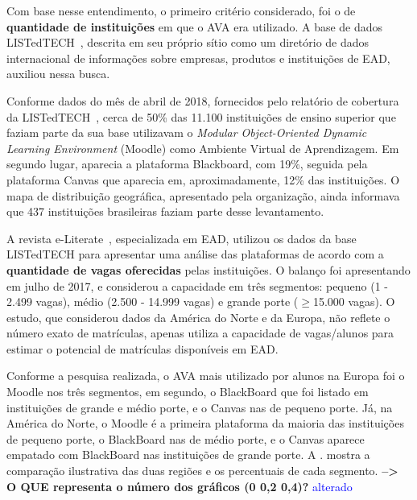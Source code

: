 Com base nesse entendimento, o primeiro critério considerado, foi o de \textbf{quantidade de instituições} em que o AVA era utilizado. A base de dados LISTedTECH~\cite{listedtech}, descrita em seu próprio sítio como um diretório de dados internacional de informações sobre empresas, produtos e instituições de EAD, auxiliou nessa busca. 

Conforme dados do mês de  abril de 2018, fornecidos pelo relatório de cobertura da LISTedTECH~\cite{listedtech}, cerca de 50\% das 11.100 instituições de ensino superior que faziam parte da sua base utilizavam o \textit{Modular Object-Oriented Dynamic Learning Environment} (Moodle) como Ambiente Virtual de Aprendizagem. Em segundo lugar, aparecia a plataforma Blackboard, com 19\%, seguida pela plataforma Canvas que aparecia em, aproximadamente, 12\% das instituições. O mapa de distribuição geográfica, apresentado pela organização, ainda informava que 437 instituições brasileiras faziam parte desse levantamento.

A revista e-Literate~\cite{phil@lms}, especializada em EAD, utilizou os dados da base LISTedTECH para apresentar uma análise das plataformas de acordo com a \textbf{quantidade de vagas oferecidas} pelas instituições. O balanço foi apresentando em julho de 2017, e considerou a capacidade em três segmentos: pequeno (1 - 2.499 vagas), médio (2.500 - 14.999 vagas) e grande porte ($\geq$15.000 vagas). O estudo, que considerou dados da América do Norte e da Europa, não reflete o número exato de matrículas, apenas utiliza a capacidade de vagas/alunos para estimar o potencial de matrículas disponíveis em EAD. %

Conforme a pesquisa realizada, o AVA mais utilizado por alunos na Europa foi o Moodle nos três segmentos, em segundo, o BlackBoard que foi listado em instituições de grande e médio porte, e o Canvas nas de pequeno porte. Já, na América do Norte, o Moodle é a primeira plataforma da maioria das instituições de pequeno porte, o BlackBoard nas de médio porte, e o Canvas aparece empatado com BlackBoard nas instituições de grande porte. A . mostra a comparação ilustrativa das duas regiões e os percentuais de cada segmento. \textbf{--> O QUE representa o número dos gráficos (0 0,2 0,4)?} \textcolor{blue}{alterado}

